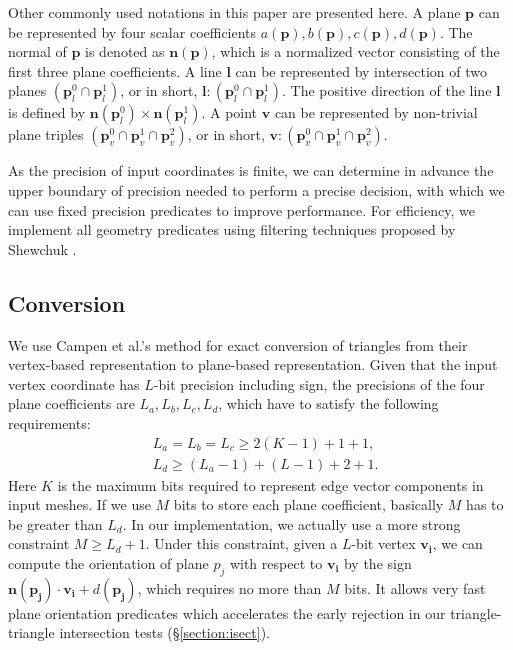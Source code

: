 \documentclass[10pt,journal,compsoc]{IEEEtran}
\begin{document}
Other commonly used notations in this paper are presented here. A plane $\bm{p}$ can be represented by four scalar coefficients $a(\bm{p}), b(\bm{p}), c(\bm{p}), d(\bm{p})$. The normal of $\bm{p}$ is denoted as $\bm{n}(\bm{p})$, which is a normalized vector consisting of the first three plane coefficients. A line $\bm{l}$ can be represented by intersection of two planes $(\bm{p}_l^0 \cap \bm{p}_l^1)$, or in short, $\bm{l}\colon(\bm{p}_l^0 \cap \bm{p}_l^1)$. The positive direction of the line $\bm{l}$ is defined by $\bm{n}(\bm{p}_l^0) \times \bm{n}(\bm{p}_l^1)$. A point $\bm{v}$ can be represented by non-trivial plane triples $(\bm{p}_v^0 \cap \bm{p}_v^1 \cap \bm{p}_v^2)$, or in short, $\bm{v}\colon(\bm{p}_v^0 \cap \bm{p}_v^1 \cap \bm{p}_v^2)$.


As the precision of input coordinates is finite, we can determine in advance the upper boundary of precision needed to perform a precise decision, with which we can use fixed precision predicates to improve performance. For efficiency, we implement all geometry predicates using filtering techniques proposed by Shewchuk \cite{shewchuk1997adaptive}.


\subsection{Conversion}

\label{sec:convert}

We use Campen et al.'s method \cite{campen2010exact} for exact conversion of triangles from their vertex-based representation to plane-based representation. Given that the input vertex coordinate has $L$-bit precision including sign, the precisions of the four plane coefficients are $L_a, L_b, L_c, L_d$, which have to satisfy the following requirements:
\begin{equation}
\begin{split}
&L_a=L_b=L_c\ge 2(K-1)+1+1,\\
&L_d\ge(L_a-1)+(L-1)+2+1.
\end{split}
\end{equation}
Here $K$ is the maximum bits required to represent edge vector components in input meshes. If we use $M$ bits to store each plane coefficient, basically $M$ has to be greater than $L_d$. In our implementation, we actually use a more strong constraint $M \ge L_d+1$. Under this constraint, given a $L$-bit vertex $\bm{v_i}$, we can compute the orientation of plane $p_j$ with respect to $\bm{v_i}$ by the sign $\bm{n}(\bm{p_j})\cdot\bm{v_i} + d(\bm{p_j})$, which requires no more than $M$ bits. It allows very fast plane orientation predicates which accelerates the early rejection in our triangle-triangle intersection tests (\S \ref{section:isect}).
\end{document}
